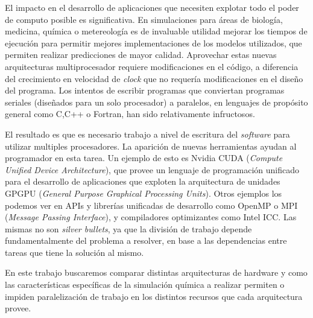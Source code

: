 El impacto en el desarrollo de aplicaciones que necesiten explotar todo el poder
de computo posible es significativa. En simulaciones para \'areas de biolog\'ia,
medicina, qu\'imica o metereolog\'ia es de invaluable utilidad mejorar los tiempos
de ejecuci\'on para permitir mejores implementaciones de los modelos utilizados,
que permiten realizar predicciones de mayor calidad. Aprovechar estas nuevas 
arquitecturas multiprocesador requiere modificaciones en el c\'odigo, a diferencia
del crecimiento en velocidad de \textit{clock} que no requer\'ia modificaciones
en el dise\~no del programa. Los intentos de escribir programas que conviertan
programas seriales (dise\~nados para un solo procesador) a paralelos, en lenguajes
de prop\'osito general como C,C++ o Fortran, han sido relativamente infructosos.

El resultado es que es necesario trabajo a nivel de escritura del \textit{software}
para utilizar multiples procesadores. La aparici\'on de nuevas herramientas ayudan
al programador en esta tarea. Un ejemplo de esto es Nvidia CUDA (\textit{Compute
Unified Device Architecture}), que provee un lenguaje de programaci\'on unificado
para el desarrollo de aplicaciones que exploten la arquitectura de unidades GPGPU
(\textit{General Purpose Graphical Processing Units}). Otros ejemplos los podemos
ver en APIs y librer\'ias unificadas de desarrollo como OpenMP o MPI 
(\textit{Message Passing Interface}), y compiladores optimizantes como Intel ICC.
Las mismas no son \textit{silver bullets}, ya que la divisi\'on de trabajo depende 
fundamentalmente del problema a resolver, en base a las dependencias entre tareas 
que tiene la soluci\'on al mismo.

En este trabajo buscaremos comparar distintas arquitecturas de hardware y como 
las caracter\'isticas espec\'ificas de la simulaci\'on qu\'imica a realizar permiten
o impiden paralelizaci\'on de trabajo en los distintos recursos que cada 
arquitectura provee.
